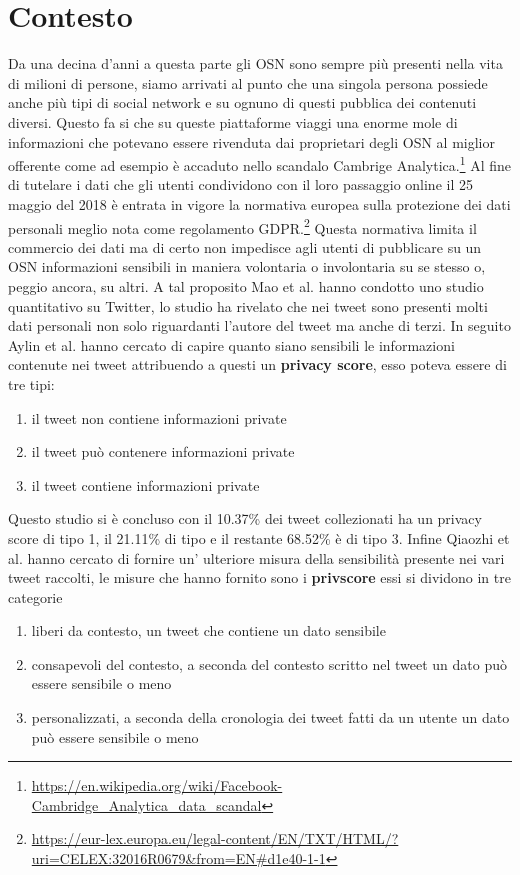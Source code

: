\section{Contesto}
Da una decina d'anni a questa parte gli OSN sono sempre più presenti nella vita di milioni di persone, siamo arrivati al punto che una singola persona possiede anche più tipi di social network e su ognuno di questi pubblica dei contenuti diversi. Questo fa si che su queste piattaforme viaggi una enorme mole di informazioni che potevano essere rivenduta dai proprietari degli OSN al miglior offerente come ad esempio è accaduto nello scandalo Cambrige Analytica.\footnote{\url{https://en.wikipedia.org/wiki/Facebook-Cambridge_Analytica_data_scandal}}\newline
Al fine di tutelare i dati che gli utenti condividono con il loro passaggio online il 25 maggio del 2018 è entrata in vigore la normativa europea sulla protezione dei dati personali meglio nota come regolamento GDPR.\footnote{\url{https://eur-lex.europa.eu/legal-content/EN/TXT/HTML/?uri=CELEX:32016R0679&from=EN\#d1e40-1-1}}
Questa normativa limita il commercio dei dati ma di certo non impedisce agli utenti di pubblicare su un OSN informazioni sensibili in maniera volontaria o involontaria su se stesso o, peggio ancora, su altri. A tal proposito Mao et al. \cite{looseTweets} hanno condotto uno studio quantitativo su Twitter, lo studio ha rivelato che nei tweet sono presenti molti dati personali non solo riguardanti l'autore del tweet ma anche di terzi. In seguito Aylin et al.\cite{privacyDetective} hanno cercato di capire quanto siano sensibili le informazioni contenute nei tweet attribuendo a questi un \textbf{privacy score}, esso poteva essere di tre tipi:
\begin{enumerate}
    \item il tweet non contiene informazioni private
    \item il tweet può contenere informazioni private
    \item il tweet contiene informazioni private
\end{enumerate}
Questo studio si è concluso con il 10.37\% dei tweet collezionati ha un privacy score di tipo 1, il 21.11\% di tipo e il restante 68.52\% è di tipo 3.
Infine Qiaozhi et al. \cite{dontTweetThis} hanno cercato di fornire un' ulteriore misura della sensibilità presente nei vari tweet raccolti, le misure che hanno fornito sono i \textbf{privscore} essi si dividono in tre categorie
\begin{enumerate}
    \item liberi da contesto, un tweet che contiene un dato sensibile
    \item consapevoli del contesto, a seconda del contesto scritto nel tweet un dato può essere sensibile o meno
    \item personalizzati, a seconda della cronologia dei tweet fatti da un utente un dato può essere sensibile o meno
\end{enumerate}

